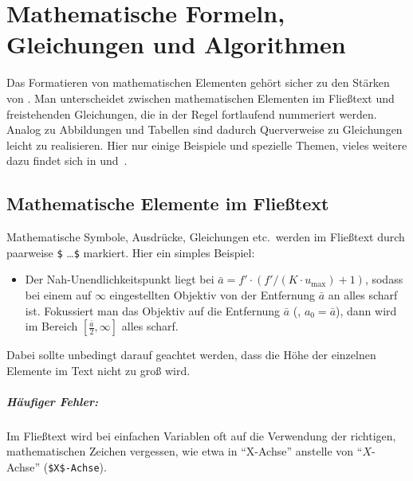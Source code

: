 \chapter[Mathem.\ Formeln etc.]{Mathematische Formeln, Gleichungen und Algorithmen}
\label{cha:Mathematik}



Das Formatieren von mathematischen Elementen gehört sicher zu den
Stär\-ken von \latex. Man unterscheidet zwischen mathematischen Elementen
im Fließtext und freistehenden Gleichungen, die in der Regel
fortlaufend nummeriert werden. Analog zu Abbildungen und Tabellen sind dadurch
Querverweise zu Gleichungen leicht zu realisieren.
Hier nur einige Beispiele und spezielle Themen, vieles weitere dazu findet sich \zB in
\cite[Kap.\ 7]{Kopka2003} und~\cite{Voss2014}.


\section{Mathematische Elemente im Fließtext}

Mathematische Symbole, Ausdrücke, Gleichungen etc.\ werden im Fließtext durch paarweise 
\verb!$! \ldots \verb!$! markiert. Hier ein simples Beispiel:
%
\begin{itemize}
\item[]
Der Nah-Unendlichkeitspunkt liegt bei
$\bar{a} = f' \cdot (f' / (K \cdot u_{\max}) + 1)$,
sodass bei einem auf $\infty$ eingestellten Objektiv von der Entfernung
$\bar{a}$ an alles scharf ist. Fokussiert man das
Objektiv auf die Entfernung $\bar{a}$ (\dah, $a_0 = \bar{a}$), dann wird
im Bereich $[\frac{\bar{a}}{2}, \infty]$ alles scharf.
\end{itemize}
%
Dabei sollte unbedingt darauf geachtet werden, dass die Höhe der einzelnen Elemente im Text nicht zu groß wird. 

\paragraph{Häufiger Fehler:} 
Im Fließtext wird bei einfachen Variablen oft auf die Verwendung der richtigen, mathematischen
Zeichen vergessen, wie etwa in "`X-Achse"' anstelle von "`$X$-Achse"' (\verb!$X$-Achse!).

